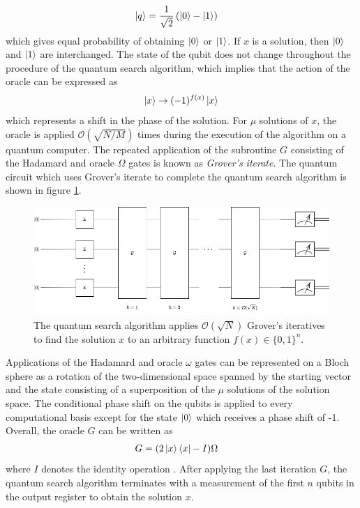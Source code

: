 \begin{align}
	\ket{q}	& = \frac{1}{\sqrt{2}}\left(\ket{0} - \ket{1}\right)\nonumber
\end{align}
which gives equal probability of obtaining $\ket{0}$ or $\ket{1}$. If $x$ is a solution, then $\ket{0}$ and $\ket{1}$ are interchanged. The state of the qubit does not change throughout the procedure of the quantum search algorithm, which implies that the action of the oracle can be expressed as
\begin{align}
	\ket{x} \rightarrow (-1)^{f(x)}\ket{x}
\end{align} 
which represents a shift in the phase of the solution. For $\mu$ solutions of $x$, the oracle is applied $\mathcal{O}(\sqrt{N/M})$ times during the execution of the algorithm on a quantum computer. The repeated application of the subroutine $G$ consisting of the Hadamard and oracle $\Omega$ gates is known as \textit{Grover's iterate}. The quantum circuit which uses Grover's iterate to complete the quantum search algorithm is shown in figure \ref{fig:grover-quantum-circuit}. 

\begin{figure}[!ht]
	\centering
	\includegraphics[width=1.0\linewidth]{body/ch2/figs/grovers-quantum-circuit}
	\caption[Generalised Quantum Circuit for Applying Grover's Search Algorithm with $k$ Iteratives.]{The quantum search algorithm applies $\mathcal{O}(\sqrt{N})$ Grover's iteratives to find the solution $x$ to an arbitrary function $f(x) \in \{0, 1\}^n$.}
	\label{fig:grover-quantum-circuit}
\end{figure}

Applications of the Hadamard and oracle $\omega$ gates can be represented on a Bloch sphere as a rotation of the two-dimensional space spanned by the starting vector and the state consisting of a superposition of the $\mu$ solutions of the solution space. The conditional phase shift on the qubits is applied to every computational basis except for the state $\ket{0}$ which receives a phase shift of -1. Overall, the oracle $G$ can be written as
\begin{align}\label{eqn:grovers-iterate}
	G & = (2\ket{x}\bra{x} - I)\Omega
\end{align}
where $I$ denotes the identity operation \cite{Nielsen2010}. After applying the last iteration $G$, the quantum search algorithm terminates with a measurement of the first $n$ qubits in the output register to obtain the solution $x$.

